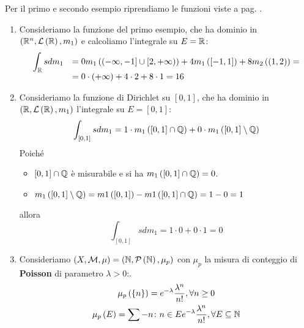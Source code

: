 \begin{examples} Per il primo e secondo esempio riprendiamo le funzioni viste a pag. \pageref{funzionesemplice}.
	\begin{enumerate}
		\item Consideriamo la funzione del primo esempio, che ha dominio in $\left(\mathbb{R}^n,\mathcal{L}\left(\mathbb{R}\right),m_1\right)$ e calcoliamo l'integrale su $E=\mathbb{R}$:
		\begin{equation*}
			\begin{array}{ll}
				\displaystyle	\int_{\mathbb{R}}sdm_1&=0m_1\left(\left(-\infty,-1\right]\cup\left[2,+\infty\right)\right)+4m_1\left(\left[-1,1\right]\right)+8m_2\left(\left(1,2\right)\right)=\\
				&=0\cdot\left(+\infty\right)+4\cdot 2+8\cdot 1=16
			\end{array}
		\end{equation*}
		\item \label{funzionedirichletintegrale}Consideriamo la funzione di Dirichlet su $\left[0,1\right]$, che ha dominio in $\left(\mathbb{R},\mathcal{L}\left(\mathbb{R}\right),m_1\right)$  l'integrale su $E=\left[0,1\right]$:
		\begin{equation*}
			\int_{\left[0,1\right]}sdm_1=1\cdot m_1\left(\left[0,1\right]\cap\mathbb{Q}\right)+0\cdot m_1\left(\left[0,1\right]\setminus\mathbb{Q}\right)
		\end{equation*}
	Poiché
	\begin{itemize}
		\item $\left[0,1\right]\cap \mathbb{Q}$ è misurabile e si ha $m_1\left(\left[0,1\right]\cap \mathbb{Q}\right)=0$.
		\item $m_1\left(\left[0,1\right]\setminus\mathbb{Q}\right)=m1\left(\left[0,1\right]\right)-m1\left(\left[0,1\right]\cap\mathbb{Q}\right)=1-0=1$
	\end{itemize}
	allora
	\begin{equation*}
		\int_{\left[0,1\right]}sdm_1=1\cdot 0+0\cdot 1=0
	\end{equation*}
\item Consideriamo $\left(X,\mathcal{M},\mu\right)=\left(\mathbb{N},\mathcal{P}\left(\mathbb{N}\right),\mu_p\right)$ con $\mu_p$ la misura di conteggio di \textbf{Poisson} di parametro $\lambda>0$:.
\begin{gather}
	\mu_p\left(\left\{n\right\}\right)=e^{-\lambda}\frac{\lambda^n}{n!}, \forall n\geq 0\\
	\mu_p\left(E\right)=\sum-{n\colon n\in E}e^{-\lambda}\frac{\lambda^n}{n!}, \forall E\subseteq \naturalset

\end{gather}
\end{enumerate}
\end{examples}
